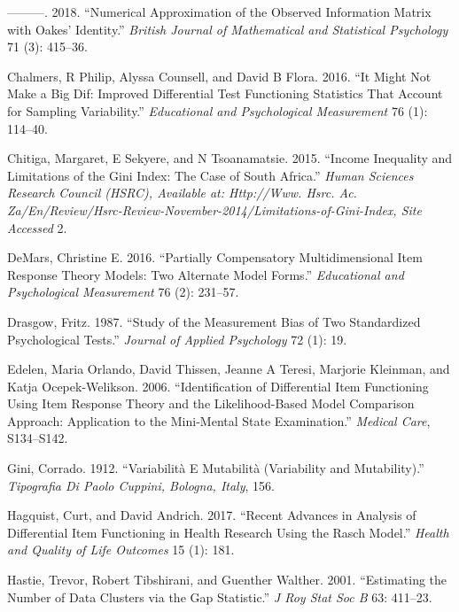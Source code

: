 \documentclass[
  11pt,
]{article}
\begin{document}
\leavevmode\hypertarget{ref-chalmers2018numerical}{}%
---------. 2018. ``Numerical Approximation of the Observed Information Matrix with Oakes' Identity.'' \emph{British Journal of Mathematical and Statistical Psychology} 71 (3): 415--36.

\leavevmode\hypertarget{ref-chalmers2016might}{}%
Chalmers, R Philip, Alyssa Counsell, and David B Flora. 2016. ``It Might Not Make a Big Dif: Improved Differential Test Functioning Statistics That Account for Sampling Variability.'' \emph{Educational and Psychological Measurement} 76 (1): 114--40.

\leavevmode\hypertarget{ref-chitiga2015income}{}%
Chitiga, Margaret, E Sekyere, and N Tsoanamatsie. 2015. ``Income Inequality and Limitations of the Gini Index: The Case of South Africa.'' \emph{Human Sciences Research Council (HSRC), Available at: Http://Www. Hsrc. Ac. Za/En/Review/Hsrc-Review-November-2014/Limitations-of-Gini-Index, Site Accessed} 2.

\leavevmode\hypertarget{ref-demars2016partially}{}%
DeMars, Christine E. 2016. ``Partially Compensatory Multidimensional Item Response Theory Models: Two Alternate Model Forms.'' \emph{Educational and Psychological Measurement} 76 (2): 231--57.

\leavevmode\hypertarget{ref-drasgow1987study}{}%
Drasgow, Fritz. 1987. ``Study of the Measurement Bias of Two Standardized Psychological Tests.'' \emph{Journal of Applied Psychology} 72 (1): 19.

\leavevmode\hypertarget{ref-edelen2006identification}{}%
Edelen, Maria Orlando, David Thissen, Jeanne A Teresi, Marjorie Kleinman, and Katja Ocepek-Welikson. 2006. ``Identification of Differential Item Functioning Using Item Response Theory and the Likelihood-Based Model Comparison Approach: Application to the Mini-Mental State Examination.'' \emph{Medical Care}, S134--S142.

\leavevmode\hypertarget{ref-gini1912variabilita}{}%
Gini, Corrado. 1912. ``Variabilità E Mutabilità (Variability and Mutability).'' \emph{Tipografia Di Paolo Cuppini, Bologna, Italy}, 156.

\leavevmode\hypertarget{ref-hagquist2017recent}{}%
Hagquist, Curt, and David Andrich. 2017. ``Recent Advances in Analysis of Differential Item Functioning in Health Research Using the Rasch Model.'' \emph{Health and Quality of Life Outcomes} 15 (1): 181.

\leavevmode\hypertarget{ref-hastie2001estimating}{}%
Hastie, Trevor, Robert Tibshirani, and Guenther Walther. 2001. ``Estimating the Number of Data Clusters via the Gap Statistic.'' \emph{J Roy Stat Soc B} 63: 411--23.
\end{document}
